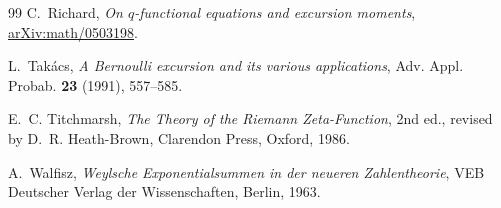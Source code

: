 \documentclass[11pt,reqno]{amsart}
\numberwithin{equation}{section}
\theoremstyle{plain}
\theoremstyle{definition}
\theoremstyle{remark}
\begin{document}
\begin{thebibliography}{99}
C.~Richard, \emph{On $q$-functional equations and excursion moments},
\href{https://arxiv.org/abs/math/0503198}{arXiv:math/0503198}.

L.~Tak\'acs, \emph{A Bernoulli excursion and its various applications},
Adv. Appl. Probab. \textbf{23} (1991), 557--585.

E.~C. Titchmarsh, \emph{The Theory of the Riemann Zeta-Function}, 2nd ed.,
revised by D.~R. Heath-Brown, Clarendon Press, Oxford, 1986.

A.~Walfisz, \emph{Weylsche Exponentialsummen in der neueren Zahlentheorie},
VEB Deutscher Verlag der Wissenschaften, Berlin, 1963.

\end{thebibliography}
\end{document}
